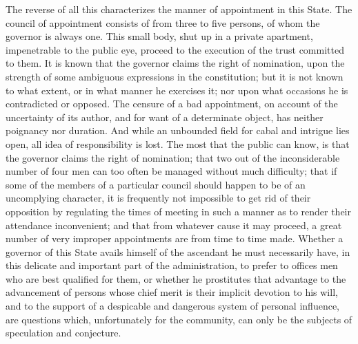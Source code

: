 The reverse of all this characterizes the manner of appointment in this State. The council of appointment consists of from three to five persons, of whom the governor is always one. This small body, shut up in a private apartment, impenetrable to the public eye, proceed to the execution of the trust committed to them. It is known that the governor claims the right of nomination, upon the strength of some ambiguous expressions in the constitution; but it is not known to what extent, or in what manner he exercises it; nor upon what occasions he is contradicted or opposed. The censure of a bad appointment, on account of the uncertainty of its author, and for want of a determinate object, has neither poignancy nor duration. And while an unbounded field for cabal and intrigue lies open, all idea of responsibility is lost. The most that the public can know, is that the governor claims the right of nomination; that two out of the inconsiderable number of four men can too often be managed without much difficulty; that if some of the members of a particular council should happen to be of an uncomplying character, it is frequently not impossible to get rid of their opposition by regulating the times of meeting in such a manner as to render their attendance inconvenient; and that from whatever cause it may proceed, a great number of very improper appointments are from time to time made. Whether a governor of this State avails himself of the ascendant he must necessarily have, in this delicate and important part of the administration, to prefer to offices men who are best qualified for them, or whether he prostitutes that advantage to the advancement of persons whose chief merit is their implicit devotion to his will, and to the support of a despicable and dangerous system of personal influence, are questions which, unfortunately for the community, can only be the subjects of speculation and conjecture.


